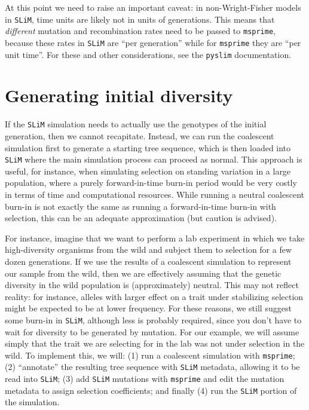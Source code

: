 \documentclass[12pt]{article}
\newcommand{\msprime}[0]{\texttt{msprime}\xspace}
\newcommand{\slim}[0]{\texttt{SLiM}\xspace}
\newcommand{\pyslim}[0]{\texttt{pyslim}\xspace}
\begin{document}
At this point we need to raise an important caveat:
in non-Wright-Fisher models in \slim,
time units are likely not in units of generations.
This means that \emph{different} mutation and recombination rates need to be passed to \msprime,
because these rates in \slim are ``per generation'' while for \msprime they are ``per unit time''.
For these and other considerations, see the \pyslim documentation.


\section{Generating initial diversity} %

If the \slim simulation needs to actually use the genotypes of the initial generation,
then we cannot recapitate.
Instead, we can run the coalescent simulation first to generate a starting tree sequence,
which is then loaded into \slim where the main simulation process can proceed as normal.
This approach is useful, for instance, when simulating selection on standing variation in a large population,
where a purely forward-in-time burn-in period would be very costly in terms of time and computational resources.
While running a neutral coalescent burn-in is not exactly the same as running a forward-in-time burn-in with selection,
this can be an adequate approximation (but caution is advised).

For instance,
imagine that we want to perform a lab experiment in which we take high-diversity
organisms from the wild and subject them to selection for a few dozen generations.
If we use the results of a coalescent simulation to represent our sample from the wild,
then we are effectively assuming that the genetic diversity in the wild population is (approximately) neutral.
This may not reflect reality: for instance,
alleles with larger effect on a trait under stabilizing selection might be expected to be at lower frequency.
For these reasons, we still suggest some burn-in in \slim,
although less is probably required, since you don't have to wait for diversity to be generated by mutation.
For our example, we will assume simply that the trait we are selecting for in the lab was
not under selection in the wild. To implement this, we will:
(1) run a coalescent simulation with \msprime;
(2) ``annotate'' the resulting tree sequence with \slim metadata, allowing it to be read into \slim;
(3) add \slim mutations with \msprime
        and edit the mutation metadata to assign selection coefficients; and finally
(4) run the \slim portion of the simulation.
\end{document}
